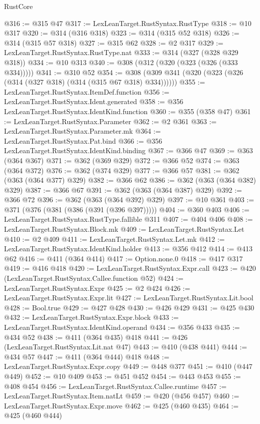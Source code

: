 \begin{lexlean}{RustCore}
\begin{coremodule}
@316 := @315 @47
@317 := LexLeanTarget.RustSyntax.RustType
@318 := @10 @317
@320 := @314 (@316 @318)
@323 := @314 (@315 @52 @318)
@326 := @314 (@315 @57 @318)
@327 := @315 @62
@328 := @2 @317
@329 := LexLeanTarget.RustSyntax.RustType.nat
@333 := @314 (@327 (@328 @329 @318))
@334 := @10 @313
@340 := @308 (@312 (@320 (@323 (@326 (@333 @334)))))
@341 := @310 @52
@354 := @308 (@309 @341 (@320 (@323 (@326 (@314 (@327 @318) (@314 (@315 @67 @318) @334))))))
@355 := LexLeanTarget.RustSyntax.ItemDef.function
@356 := LexLeanTarget.RustSyntax.Ident.generated
@358 := @356 LexLeanTarget.RustSyntax.IdentKind.function
@360 := @355 (@358 @47)
@361 := LexLeanTarget.RustSyntax.Parameter
@362 := @2 @361
@363 := LexLeanTarget.RustSyntax.Parameter.mk
@364 := LexLeanTarget.RustSyntax.Pat.bind
@366 := @356 LexLeanTarget.RustSyntax.IdentKind.binding
@367 := @366 @47
@369 := @363 (@364 @367)
@371 := @362 (@369 @329)
@372 := @366 @52
@374 := @363 (@364 @372)
@376 := @362 (@374 @329)
@377 := @366 @57
@381 := @362 (@363 (@364 @377) @329)
@382 := @366 @62
@386 := @362 (@363 (@364 @382) @329)
@387 := @366 @67
@391 := @362 (@363 (@364 @387) @329)
@392 := @366 @72
@396 := @362 (@363 (@364 @392) @329)
@397 := @10 @361
@403 := @371 (@376 (@381 (@386 (@391 (@396 @397)))))
@404 := @360 @403
@406 := LexLeanTarget.RustSyntax.RustType.fallible @311
@407 := @404 @406
@408 := LexLeanTarget.RustSyntax.Block.mk
@409 := LexLeanTarget.RustSyntax.Let
@410 := @2 @409
@411 := LexLeanTarget.RustSyntax.Let.mk
@412 := LexLeanTarget.RustSyntax.IdentKind.holder
@413 := @356 @412
@414 := @413 @62
@416 := @411 (@364 @414)
@417 := Option.none.{0}
@418 := @417 @317
@419 := @416 @418
@420 := LexLeanTarget.RustSyntax.Expr.call
@423 := @420 (LexLeanTarget.RustSyntax.Callee.function @52)
@424 := LexLeanTarget.RustSyntax.Expr
@425 := @2 @424
@426 := LexLeanTarget.RustSyntax.Expr.lit
@427 := LexLeanTarget.RustSyntax.Lit.bool
@428 := Bool.true
@429 := @427 @428
@430 := @426 @429
@431 := @425 @430
@432 := LexLeanTarget.RustSyntax.Expr.block
@433 := LexLeanTarget.RustSyntax.IdentKind.operand
@434 := @356 @433
@435 := @434 @52
@438 := @411 (@364 @435) @418
@441 := @426 (LexLeanTarget.RustSyntax.Lit.nat @47)
@443 := @410 (@438 @441)
@444 := @434 @57
@447 := @411 (@364 @444) @418
@448 := LexLeanTarget.RustSyntax.Expr.copy
@449 := @448 @377
@451 := @410 (@447 @449)
@452 := @10 @409
@453 := @451 @452
@454 := @443 @453
@455 := @408 @454
@456 := LexLeanTarget.RustSyntax.Callee.runtime
@457 := LexLeanTarget.RustSyntax.Item.natLt
@459 := @420 (@456 @457)
@460 := LexLeanTarget.RustSyntax.Expr.move
@462 := @425 (@460 @435)
@464 := @425 (@460 @444)

\end{coremodule}
\end{lexlean}
